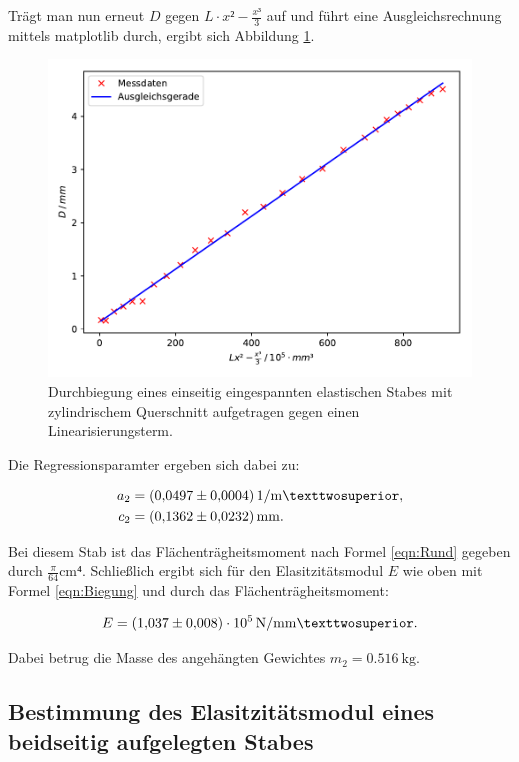Trägt man nun erneut $D$ gegen $L\cdot x²-\frac{x³}{3}$ auf und führt eine
Ausgleichsrechnung mittels matplotlib durch, ergibt sich Abbildung \ref{fig:plot2}. 

\begin{figure}
  \centering
  \includegraphics[scale=0.8]{content/plot2.pdf}
  \caption{Durchbiegung eines einseitig eingespannten elastischen Stabes mit zylindrischem Querschnitt aufgetragen
  gegen einen Linearisierungsterm.}
  \label{fig:plot2}
\end{figure}

Die Regressionsparamter ergeben sich dabei zu: 

\begin{align*}
a_2 &= \SI{0.0497+-0.0004}{1\per\meter²},\\ 
c_2 &= \SI{0.1362+-0.0232}{\milli\meter}.
\end{align*}

Bei diesem Stab ist das Flächenträgheitsmoment nach Formel \eqref{eqn:Rund}
gegeben durch $\frac{\pi}{64}\si{\centi\meter⁴}$.
Schließlich ergibt sich für den Elasitzitätsmodul $E$ wie oben mit Formel 
\eqref{eqn:Biegung} und durch das Flächenträgheitsmoment:

\begin{equation*}
E = \SI{1.037+-0.008e5}{\newton\per\milli\meter²}.
\end{equation*}

Dabei betrug die Masse des angehängten Gewichtes $m_2 = \SI{0.516}{\kilo\gram}$.

\subsection{Bestimmung des Elasitzitätsmodul eines beidseitig aufgelegten Stabes}

